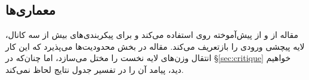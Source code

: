 \subsection{معماری‌ها}
مقاله از  \cite{simonyan2015vgg} و  \cite{he2016resnet} از پیش‌آموخته روی  استفاده می‌کند و برای پیکربندی‌های بیش از سه کانال، لایه پیچشی ورودی را بازتعریف می‌کند. مقاله در بخش محدودیت‌ها می‌پذیرد که این کار انتقال وزن‌های لایه نخست را مختل می‌سازد، اما چنان‌که در \S\ref{sec:critique} خواهیم دید، پیامد آن را در تفسیر جدول نتایج لحاظ نمی‌کند.
